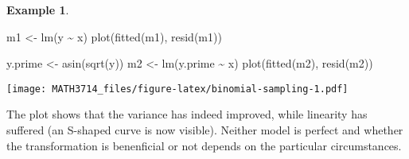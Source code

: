 \documentclass[
  a4paper,
]{article}
\newenvironment{Shaded}{\begin{snugshade}}{\end{snugshade}}
\newcommand{\FunctionTok}[1]{\textcolor[rgb]{0.00,0.00,0.00}{#1}}
\newcommand{\NormalTok}[1]{#1}
\newcommand{\OtherTok}[1]{\textcolor[rgb]{0.56,0.35,0.01}{#1}}
\newcommand{\SpecialCharTok}[1]{\textcolor[rgb]{0.00,0.00,0.00}{#1}}
\theoremstyle{definition}
\theoremstyle{definition}
\newtheorem{example}{Example}[section]
\theoremstyle{definition}
\theoremstyle{definition}
\theoremstyle{remark}
\begin{document}
\begin{example}
\begin{Shaded}
\begin{Highlighting}[]
\NormalTok{m1 }\OtherTok{\textless{}{-}} \FunctionTok{lm}\NormalTok{(y }\SpecialCharTok{\textasciitilde{}}\NormalTok{ x)}
\FunctionTok{plot}\NormalTok{(}\FunctionTok{fitted}\NormalTok{(m1), }\FunctionTok{resid}\NormalTok{(m1))}

\NormalTok{y.prime }\OtherTok{\textless{}{-}} \FunctionTok{asin}\NormalTok{(}\FunctionTok{sqrt}\NormalTok{(y))}
\NormalTok{m2 }\OtherTok{\textless{}{-}} \FunctionTok{lm}\NormalTok{(y.prime }\SpecialCharTok{\textasciitilde{}}\NormalTok{ x)}
\FunctionTok{plot}\NormalTok{(}\FunctionTok{fitted}\NormalTok{(m2), }\FunctionTok{resid}\NormalTok{(m2))}
\end{Highlighting}
\end{Shaded}

\texttt{[image: MATH3714\_files/figure-latex/binomial-sampling-1.pdf]}

The plot shows that the variance has indeed improved, while linearity
has suffered (an S-shaped curve is now visible). Neither model is perfect and
whether the transformation
is benenficial or not depends on the particular circumstances.
\end{example}
\end{document}

